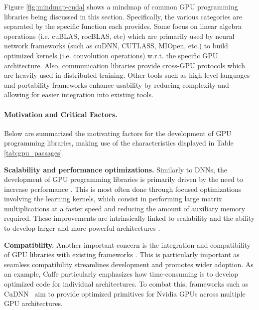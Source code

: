 Figure \ref{fig:mindmap-cuda} shows a mindmap of common GPU programming libraries being discussed
in this section. Specifically, the various categories are separated by the specific function each
provides. Some focus on linear algebra operations (i.e. cuBLAS, rocBLAS, etc) which are primarily
used by neural network frameworks (such as cuDNN, CUTLASS, MIOpen, etc.) to build optimized kernels
(i.e. convolution operations) w.r.t. the specific GPU architecture. Also, communication libraries
provide cross-GPU protocols which are heavily used in distributed training. Other tools such as
high-level languages and portability frameworks enhance usability by reducing complexity and
allowing for easier integration into existing tools.

\paragraph{Motivation and Critical Factors.}
Below are summarized the motivating factors for the development of GPU programming libraries,
making use of the characteristics displayed in Table \ref{tab:gpu_passages}.

\textbf{Scalability and performance optimizations.}
Similarly to DNNs, the development of GPU programming libraries is primarily driven by the need to increase
performance . This is most often done through focused optimizations
involving the learning kernels, which consist in performing large matrix multiplications at a
faster speed and reducing the amount of auxiliary memory required. These improvements are
intrinsically linked to scalability and the ability to develop larger and more powerful
architectures .

\textbf{Compatibility.}
Another important concern is the integration and compatibility of GPU libraries with existing
frameworks . This is particularly important as seamless
compatibility streamlines development and promotes wider adoption. As an example, Caffe
\cite{Jia.EtAl_2014a} particularly emphasizes how time-consuming is to develop optimized code for
individual architectures. To combat this, frameworks such as CuDNN~\cite{chetlur_cudnn_2014} aim
to provide optimized primitives for Nvidia GPUs across multiple GPU architectures.

